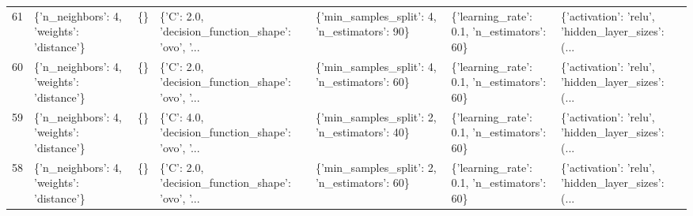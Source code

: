 \begin{tabular}{lllllll}
61  &  \{'n\_neighbors': 4, 'weights': 'distance'\} &  \{\} &  \{'C': 2.0, 'decision\_function\_shape': 'ovo', '... &   \{'min\_samples\_split': 4, 'n\_estimators': 90\} &  \{'learning\_rate': 0.1, 'n\_estimators': 60\} &  \{'activation': 'relu', 'hidden\_layer\_sizes': (... \\
60  &  \{'n\_neighbors': 4, 'weights': 'distance'\} &  \{\} &  \{'C': 2.0, 'decision\_function\_shape': 'ovo', '... &   \{'min\_samples\_split': 4, 'n\_estimators': 60\} &  \{'learning\_rate': 0.1, 'n\_estimators': 60\} &  \{'activation': 'relu', 'hidden\_layer\_sizes': (... \\
59  &  \{'n\_neighbors': 4, 'weights': 'distance'\} &  \{\} &  \{'C': 4.0, 'decision\_function\_shape': 'ovo', '... &   \{'min\_samples\_split': 2, 'n\_estimators': 40\} &  \{'learning\_rate': 0.1, 'n\_estimators': 60\} &  \{'activation': 'relu', 'hidden\_layer\_sizes': (... \\
58  &  \{'n\_neighbors': 4, 'weights': 'distance'\} &  \{\} &  \{'C': 2.0, 'decision\_function\_shape': 'ovo', '... &   \{'min\_samples\_split': 2, 'n\_estimators': 60\} &  \{'learning\_rate': 0.1, 'n\_estimators': 60\} &  \{'activation': 'relu', 'hidden\_layer\_sizes': (... \\
\bottomrule
\end{tabular}
